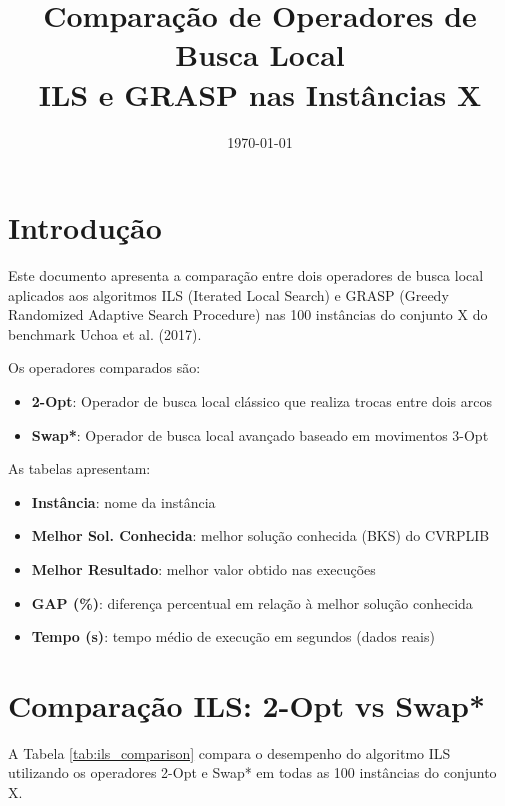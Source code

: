 \documentclass[12pt,a4paper]{article}
\title{Comparação de Operadores de Busca Local\\ILS e GRASP nas Instâncias X}
\author{}
\date{\today}
\begin{document}
\maketitle

\section{Introdução}

Este documento apresenta a comparação entre dois operadores de busca local aplicados aos algoritmos ILS (Iterated Local Search) e GRASP (Greedy Randomized Adaptive Search Procedure) nas 100 instâncias do conjunto X do benchmark Uchoa et al. (2017).

Os operadores comparados são:
\begin{itemize}
    \item \textbf{2-Opt}: Operador de busca local clássico que realiza trocas entre dois arcos
    \item \textbf{Swap*}: Operador de busca local avançado baseado em movimentos 3-Opt
\end{itemize}

As tabelas apresentam:
\begin{itemize}
    \item \textbf{Instância}: nome da instância
    \item \textbf{Melhor Sol. Conhecida}: melhor solução conhecida (BKS) do CVRPLIB
    \item \textbf{Melhor Resultado}: melhor valor obtido nas execuções
    \item \textbf{GAP (\%)}: diferença percentual em relação à melhor solução conhecida
    \item \textbf{Tempo (s)}: tempo médio de execução em segundos (dados reais)
\end{itemize}

\clearpage

\section{Comparação ILS: 2-Opt vs Swap*}

A Tabela \ref{tab:ils_comparison} compara o desempenho do algoritmo ILS utilizando os operadores 2-Opt e Swap* em todas as 100 instâncias do conjunto X.
\end{document}
